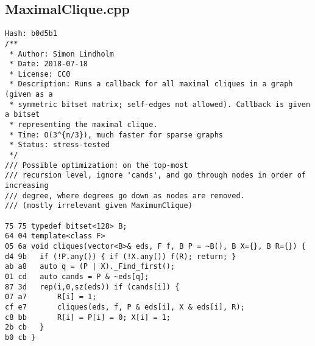 \documentclass[11pt, a4paper, twoside]{article}
\begin{document}
\subsection{MaximalClique.cpp}
\begin{lstlisting}
Hash: b0d5b1
/**
 * Author: Simon Lindholm
 * Date: 2018-07-18
 * License: CC0
 * Description: Runs a callback for all maximal cliques in a graph (given as a
 * symmetric bitset matrix; self-edges not allowed). Callback is given a bitset
 * representing the maximal clique.
 * Time: O(3^{n/3}), much faster for sparse graphs
 * Status: stress-tested
 */
/// Possible optimization: on the top-most
/// recursion level, ignore 'cands', and go through nodes in order of increasing
/// degree, where degrees go down as nodes are removed.
/// (mostly irrelevant given MaximumClique)

75 75 typedef bitset<128> B;
64 04 template<class F>
05 6a void cliques(vector<B>& eds, F f, B P = ~B(), B X={}, B R={}) {
d4 9b 	if (!P.any()) { if (!X.any()) f(R); return; }
ab a8 	auto q = (P | X)._Find_first();
01 cd 	auto cands = P & ~eds[q];
87 3d 	rep(i,0,sz(eds)) if (cands[i]) {
07 a7 		R[i] = 1;
cf e7 		cliques(eds, f, P & eds[i], X & eds[i], R);
c8 bb 		R[i] = P[i] = 0; X[i] = 1;
2b cb 	}
b0 cb }
\end{lstlisting}
\end{document}
